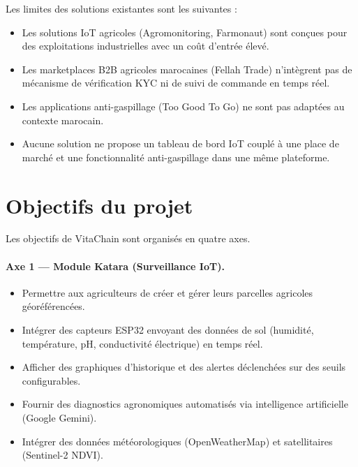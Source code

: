 \documentclass[12pt,a4paper]{report}
\begin{document}
Les limites des solutions existantes sont les suivantes :

\begin{itemize}
  \item Les solutions IoT agricoles (Agromonitoring, Farmonaut) sont conçues pour des
        exploitations industrielles avec un coût d'entrée élevé.
  \item Les marketplaces B2B agricoles marocaines (Fellah Trade) n'intègrent pas de
        mécanisme de vérification KYC ni de suivi de commande en temps réel.
  \item Les applications anti-gaspillage (Too Good To Go) ne sont pas adaptées au
        contexte marocain.
  \item Aucune solution ne propose un tableau de bord IoT couplé à une place de marché
        et une fonctionnalité anti-gaspillage dans une même plateforme.
\end{itemize}

\section{Objectifs du projet}

Les objectifs de VitaChain sont organisés en quatre axes.

\paragraph{Axe 1 --- Module Katara (Surveillance IoT).}
\begin{itemize}
  \item Permettre aux agriculteurs de créer et gérer leurs parcelles agricoles
        géoréférencées.
  \item Intégrer des capteurs ESP32 envoyant des données de sol (humidité, température,
        pH, conductivité électrique) en temps réel.
  \item Afficher des graphiques d'historique et des alertes déclenchées sur des seuils
        configurables.
  \item Fournir des diagnostics agronomiques automatisés via intelligence artificielle
        (Google Gemini).
  \item Intégrer des données météorologiques (OpenWeatherMap) et satellitaires
        (Sentinel-2 NDVI).
\end{itemize}
\end{document}
